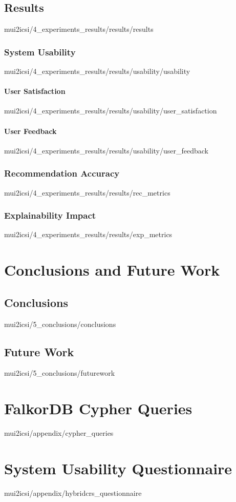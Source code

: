 \documentclass[english,epsbased,copyright,final,printable,covers,extendedindex,firstnumbered,tfm,gnuplot,loc,loe,lof,lot]{tfgtfmthesisuam}
\begin{document}
    \section{Results\label{SEC:RESULTS}}{mui2icsi/4_experiments_results/results/results}
      \subsection{System Usability\label{SS:USABILITY}}{mui2icsi/4_experiments_results/results/usability/usability}
        \subsubsection{User Satisfaction\label{SSS:USERSAT}}{mui2icsi/4_experiments_results/results/usability/user_satisfaction}
        \subsubsection{User Feedback\label{SSS:USERFEEDBACK}}{mui2icsi/4_experiments_results/results/usability/user_feedback}
      \subsection{Recommendation Accuracy\label{SS:RECACC}}{mui2icsi/4_experiments_results/results/rec_metrics}
      \subsection{Explainability Impact\label{SS:EXPLAIN}}{mui2icsi/4_experiments_results/results/exp_metrics}

  \chapter{Conclusions and Future Work\label{CAP:CONCLUSIONS}}
    \section{Conclusions\label{SEC:CONCLUSIONS}}{mui2icsi/5_conclusions/conclusions}

    \section{Future Work\label{SEC:FUTUREWORK}}{mui2icsi/5_conclusions/futurework}

  \appendix
  \chapter{FalkorDB Cypher Queries\label{AP:CYPHER_QUERIES}}{mui2icsi/appendix/cypher_queries}
  \chapter{System Usability Questionnaire\label{AP:HYBRIDCRS_QUESTIONNAIRE}}{mui2icsi/appendix/hybridcrs_questionnaire}
\end{document}
